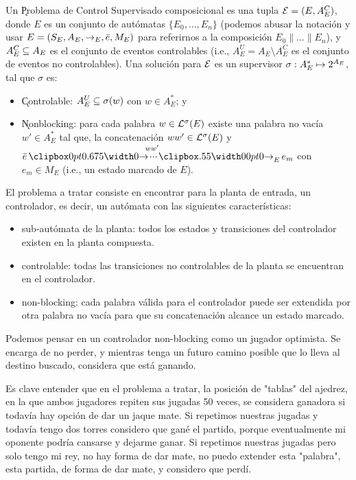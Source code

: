\begin{definition} \label{def:control-problem}
	Un \k{Problema de Control Supervisado} composicional es una tupla $\mathcal{E} = (E, A_E^C)$, donde $E$ es un conjunto de autómatas $\{E_0,\ldots,E_n\}$ (podemos abusar la notación y usar $E = (S_E,A_E,\rightarrow_E,\bar{e},M_E)$ para referirnos a la composición $E_0\|\ldots\|E_n$), y $A_E^C \subseteq A_E$ es el conjunto de eventos controlables (i.e., $A_E^U = A_E \setminus A_E^C$ es el conjunto de eventos no controlables).
	Una solución para $\mathcal{E}$ es un supervisor $\sigma : A_E^* \mapsto 2^{A_E}$, tal que $\sigma$ es:
	\begin{itemize}[itemsep=4pt,topsep=-8pt]
		
		\item \k{Controlable}: $A_E^U \subseteq \sigma(w)$ con $w \in A_E^*$; y
		
		\item \k{Nonblocking}: para cada palabra $w \in \mathcal{L}^\sigma(E)$ existe una palabra no vacía $w' \in A_E^*$ tal que, la concatenación $ww' \in \mathcal{L}^\sigma(E)$ y $\init{e} \runw{\;ww'}{E} e_m$ con $e_m \in M_E$ (i.e., un estado marcado de $E$).
		
	\end{itemize}
	
\end{definition}


El problema a tratar consiste en encontrar para la planta de entrada, un controlador, es decir, un autómata con las siguientes características:

\begin{itemize}
	\item sub-autómata de la planta: todos los estados y transiciones del controlador existen en la planta compuesta.
	
	\item controlable: todas las transiciones no controlables de la planta se encuentran en el controlador.
	
	\item non-blocking: cada palabra válida para el controlador puede ser extendida por otra palabra no vacía para que su concatenación alcance un estado marcado.
\end{itemize}

Podemos pensar en un controlador non-blocking como un jugador optimista. Se encarga de no perder, y mientras tenga un futuro camino posible que lo lleva al destino buscado, considera que está ganando.

Es clave entender que en el problema a tratar, la posición de "tablas" del ajedrez, en la que ambos jugadores repiten sus jugadas 50 veces, se considera ganadora si todavía hay opción de dar un jaque mate. Si repetimos nuestras jugadas y todavía tengo dos torres considero que gané el partido, porque eventualmente mi oponente podría cansarse y dejarme ganar. Si repetimos nuestras jugadas pero solo tengo mi rey, no hay forma de dar mate, no puedo extender esta "palabra", esta partida, de forma de dar mate, y considero que perdí.

